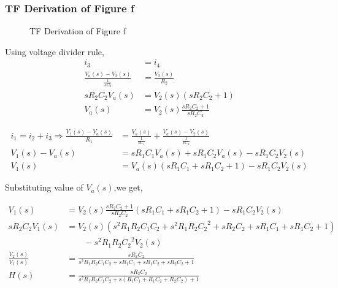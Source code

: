 \documentclass[a4paper,11pt]{article}
\begin{document}
\subsubsection{TF Derivation of Figure f}
\begin{figure}[H]
    \centering
    \figf \figfs
    \caption{TF Derivation of Figure f}
\end{figure}


Using voltage divider rule,
\begin{equation*}
    \begin{aligned}
        i_3                                  & =i_4                             \\
        \frac{V_a(s)-V_2(s)}{\frac{1}{sC_2}} & =\frac{V_2(s)}{R_2}              \\
        sR_2C_2V_a(s)                        & =V_2(s)(sR_2C_2+1)               \\
        V_a(s)                               & =V_2(s)\frac{sR_2C_2+1}{sR_2C_2}
    \end{aligned}
\end{equation*}


\begin{equation*}
    \begin{aligned}
        i_1=i_2+i_3 \Rightarrow \frac{V_1(s)-V_a(s)}{R_1} & =\frac{V_a(s)}{\frac{1}{sC_1}}+\frac{V_a(s)-V_2(s)}{\frac{1}{sC_2}} \\
        V_1(s)-V_a(s)                                     & =sR_1C_1V_a(s)+sR_1C_2V_a(s)-sR_1C_2V_2(s)                          \\
        V_1(s)                                            & =V_a(s)(sR_1C_1+sR_1C_2+1)-sR_1C_2V_2(s)
    \end{aligned}
\end{equation*}

Substituting value of $V_a(s)$,we get,

\begin{equation*}
    \begin{aligned}
        V_1(s)                & =V_2(s)\frac{sR_2C_2+1}{sR_2C_2}(sR_1C_1+sR_1C_2+1)-sR_1C_2V_2(s)   \\
        sR_2C_2V_1(s)         & =V_2(s)(s^2R_1R_2C_1C_2+s^2R_1R_2{C_2}^2+sR_2C_2+sR_1C_1+sR_1C_2+1) \\
                              & \quad \quad -s^2R_1R_2{C_2}^2V_2(s)                                 \\
        \frac{V_2(s)}{V_1(s)} & =\frac{sR_2C_2}{s^2R_1R_2C_1C_2+sR_1C_1+sR_1C_2+sR_2C_2+1}          \\
        H(s)                  & =\frac{sR_2C_2}{s^2R_1R_2C_1C_2+s(R_1C_1+R_1C_2+R_2C_2)+1}
    \end{aligned}
\end{equation*}
\end{document}
